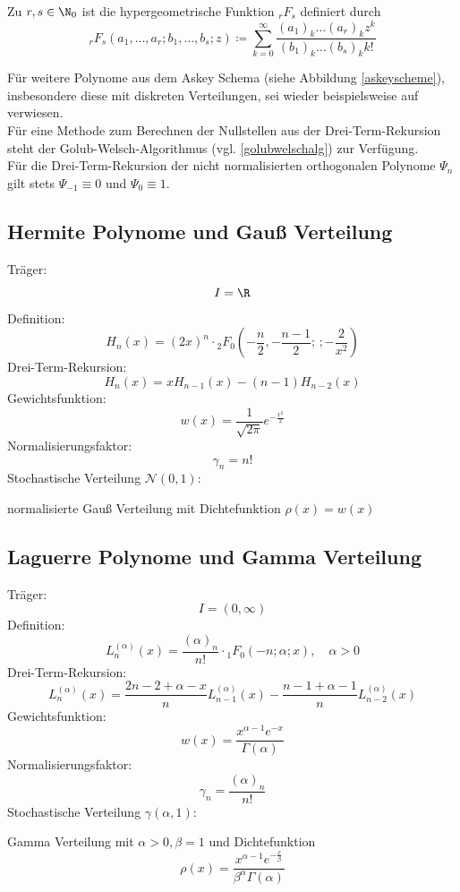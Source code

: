 \begin{mathdef}
Zu $r,s\in\N_0$ ist die hypergeometrische Funktion $_rF_s$ definiert durch
\[_rF_s(a_1,\dots,a_r;b_1,\dots,b_s;z)\coloneqq \sum_{k=0}^\infty \frac{(a_1)_k\dots (a_r)_kz^k}{(b_1)_k\dots(b_s)_kk!}\]
\end{mathdef}
Für weitere Polynome aus dem Askey Schema (siehe Abbildung \ref{askeyscheme}), insbesondere diese mit diskreten Verteilungen, sei wieder beispielsweise auf \autocite{dongbinxiu2010} verwiesen. \\
Für eine Methode zum Berechnen der Nullstellen aus der Drei-Term-Rekursion steht der Golub-Welsch-Algorithmus (vgl. \ref{golubwelschalg}) zur Verfügung.\\
Für die Drei-Term-Rekursion der nicht normalisierten orthogonalen Polynome $\Psi_n$ gilt stets $\Psi_{-1}\equiv 0$ und $\Psi_{0}\equiv 1$.
\subsection{Hermite Polynome und Gauß Verteilung}
Träger:
\[I=\R\]
Definition:
\[H_n(x)=(2x)^n\cdot {_2F_0}\left(-\frac{n}{2},-\frac{n-1}{2};\, ;-\frac{2}{x^2}\right)\]
Drei-Term-Rekursion:
\[H_{n}(x)=xH_{n-1}(x)-(n-1)H_{n-2}(x)\]
Gewichtsfunktion:
\[w(x)=\frac{1}{\sqrt{2\pi}}e^{-\frac{x^2}{2}}\]
Normalisierungsfaktor:
\[\gamma_n=n!\]
Stochastische Verteilung $\mathcal{N}(0,1)$:
\begin{center}
normalisierte Gauß Verteilung mit Dichtefunktion $\rho(x)=w(x)$
\end{center}

\subsection{Laguerre Polynome und Gamma Verteilung}
Träger:
\[I=(0,\infty)\]
Definition:
\[L_n^{(\alpha)}(x)=\frac{(\alpha)_n}{n!}\cdot {_1F_0}\left(-n;\alpha;x\right),\quad \alpha>0\]
Drei-Term-Rekursion:
\[L_{n}^{(\alpha)}(x)=\frac{2n-2+\alpha -x}{n}L_{n-1}^{(\alpha)}(x)-\frac{n-1+\alpha - 1}{n}L_{n-2}^{(\alpha)}(x)\]
Gewichtsfunktion:
\[w(x)=\frac{x^{\alpha-1}e^{-x}}{\Gamma(\alpha)}\]
Normalisierungsfaktor:
\[\gamma_n=\frac{(\alpha)_n}{n!}\]
Stochastische Verteilung $\gamma(\alpha,1)$:
\begin{center}
Gamma Verteilung mit $\alpha>0,\beta=1$ und Dichtefunktion
\[\rho(x)=\frac{x^{\alpha-1}e^{-\frac{x}{\beta}}}{\beta^{\alpha}\Gamma(\alpha)}\]
\end{center}

